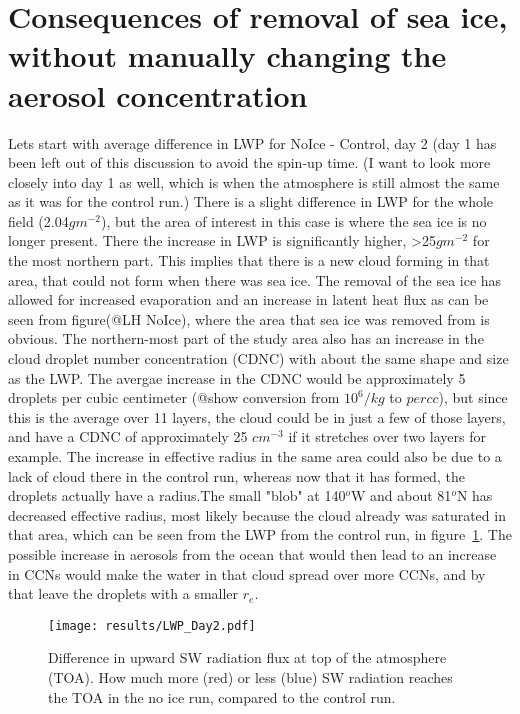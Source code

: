 \section{Consequences of removal of sea ice, without manually changing the aerosol concentration}
Lets start with average difference in LWP for NoIce - Control, day 2 (day 1 has been left out of this discussion to avoid the spin-up time. (I want to look more closely into day 1 as well, which is when the atmosphere is still almost the same as it was for the control run.)
 There is a slight difference in LWP for the whole field (2.04$gm^{-2}$), but the area of interest in this case is where the sea ice is no longer present. There the increase in LWP is significantly higher, >25$gm^{-2}$ for the most northern part. This implies that there is a new cloud forming in that area, that could not form when there was sea ice. The removal of the sea ice has allowed for increased evaporation and an increase in latent heat flux as can be seen from figure(@LH NoIce), where the area that sea ice was removed from is obvious. The northern-most part of the study area also has an increase in the cloud droplet number concentration (CDNC) with about the same shape and size as the LWP. The avergae increase in the CDNC would be approximately 5 droplets per cubic centimeter (@show conversion from $10^6/kg$ to $per cc$), but since this is the average over 11 layers, the cloud could be in just a few of those layers, and have a CDNC of approximately 25 $cm^{-3}$ if it stretches over two layers for example. The increase in effective radius in the same area could also be due to a lack of cloud there in the control run, whereas now that it has formed, the droplets actually have a radius.The small "blob" at 140$^o$W and about 81$^o$N has decreased effective radius, most likely because the cloud already was saturated in that area, which can be seen from the LWP from the control run, in figure~\ref{fig:LWPr1Day2}. The possible increase in aerosols from the ocean that would then lead to an increase in CCNs would make the water in that cloud spread over more CCNs, and by that leave the droplets with a smaller $r_e$.

\begin{figure}
\centering
\texttt{[image: results/LWP\_Day2.pdf]}
\caption{Difference in upward SW radiation flux at top of the atmosphere (TOA). How much more (red) or less (blue) SW radiation reaches the TOA in the no ice run, compared to the control run.}
\label{fig:LWPr1Day2}
\end{figure}

